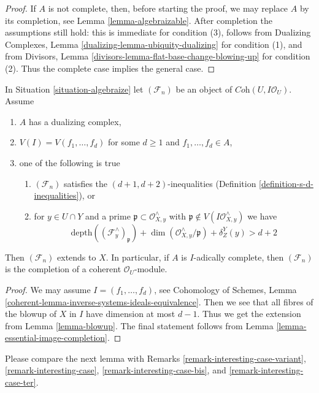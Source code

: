 \begin{proof}
\medskip\noindent
If $A$ is not complete, then, before starting the proof, we may replace $A$
by its completion, see Lemma \ref{lemma-algebraizable}.
After completion the assumptions still hold: this is immediate
for condition (3), follows from
Dualizing Complexes, Lemma \ref{dualizing-lemma-ubiquity-dualizing}
for condition (1), and from
Divisors, Lemma \ref{divisors-lemma-flat-base-change-blowing-up}
for condition (2).
Thus the complete case implies the general case.
\end{proof}

\begin{proposition}
\label{proposition-d-generators}
In Situation \ref{situation-algebraize} let $(\mathcal{F}_n)$
be an object of $\textit{Coh}(U, I\mathcal{O}_U)$. Assume
\begin{enumerate}
\item $A$ has a dualizing complex,
\item $V(I) = V(f_1, \ldots, f_d)$ for some $d \geq 1$ and
$f_1, \ldots, f_d \in A$,
\item one of the following is true
\begin{enumerate}
\item $(\mathcal{F}_n)$ satisfies the $(d + 1, d + 2)$-inequalities
(Definition \ref{definition-s-d-inequalities}), or
\item for $y \in U \cap Y$ and a prime
$\mathfrak p \subset \mathcal{O}_{X, y}^\wedge$ with
$\mathfrak p \not \in V(I\mathcal{O}_{X, y}^\wedge)$
we have
$$
\text{depth}((\mathcal{F}^\wedge_y)_\mathfrak p) +
\dim(\mathcal{O}_{X, y}^\wedge/\mathfrak p) + \delta^Y_Z(y) > d + 2
$$
\end{enumerate}
\end{enumerate}
Then $(\mathcal{F}_n)$ extends to $X$. In particular, if $A$ is
$I$-adically complete, then $(\mathcal{F}_n)$ is the completion
of a coherent $\mathcal{O}_U$-module. 
\end{proposition}

\begin{proof}
We may assume $I = (f_1, \ldots, f_d)$, see
Cohomology of Schemes, Lemma
\ref{coherent-lemma-inverse-systems-ideals-equivalence}.
Then we see that
all fibres of the blowup of $X$ in $I$ have dimension at most $d - 1$.
Thus we get the extension from Lemma \ref{lemma-blowup}.
The final statement follows from Lemma \ref{lemma-essential-image-completion}.
\end{proof}

\noindent
Please compare the next lemma with
Remarks \ref{remark-interesting-case-variant},
\ref{remark-interesting-case},
\ref{remark-interesting-case-bis}, and
\ref{remark-interesting-case-ter}.


